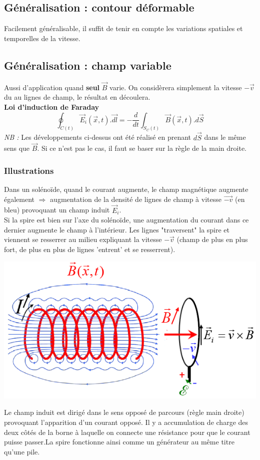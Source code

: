 \documentclass	[11pt, a4paper, openany]{book}
\begin{document}
\subsection{Généralisation : contour déformable}
Facilement généralisable, il suffit de tenir en compte les variations spatiales et temporelles de la vitesse.

\subsection{Généralisation : champ variable}
Aussi d'application quand \textbf{seul} $\vec{B}$ varie. On considèrera simplement la vitesse $-\vec{v}$ du au lignes de champ, le résultat en découlera.\\
\textbf{Loi d'induction de Faraday}
\begin{equation}
	\oint_{C(t)} \vec{E}_i(\vec{x}, t).\vec{dl} = -\frac{d}{dt}\int_{S_C(t)} \vec{B}(\vec{x}, t).d\vec{S}
\end{equation}
\textit{NB :} Les développements ci-dessus ont été réalisé en prenant $d\vec{S}$ dans le même sens que $\vec{B}$. Si ce n'est pas le cas, il faut se baser sur la règle de la main droite.

\subsubsection*{Illustrations}
Dans un solénoïde, quand le courant augmente, le champ magnétique augmente également $\Rightarrow$ augmentation de la densité de lignes de champ à vitesse $\vec{-v}$ (en bleu) provoquant un champ induit $\vec{E}_i$.\\
Si la spire est bien sur l'axe du solénoïde, une augmentation du courant dans ce dernier augmente le champ à l'intérieur. Les lignes "traversent" la spire et viennent se resserrer au milieu expliquant la vitesse $-\vec{v}$ (champ de plus en plus fort, de plus en plus de lignes 'entrent' et se resserrent).
\begin{center}
	\includegraphics[scale=0.45]{em/image14.png}\\
\end{center}
Le champ induit est dirigé dans le sens opposé de parcours (règle main droite) provoquant l'apparition d'un courant opposé. Il y a accumulation de charge des deux côtés de la borne à laquelle on connecte une résistance pour que le courant puisse passer.La spire fonctionne ainsi comme un générateur au même titre qu'une pile.
\end{document}
